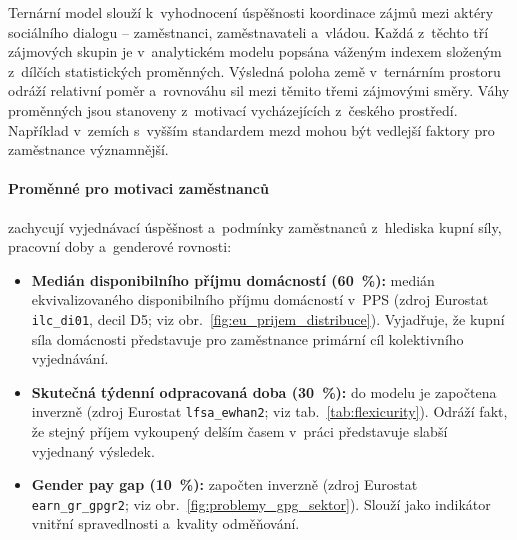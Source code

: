 Ternární model slouží k~vyhodnocení úspěšnosti koordinace zájmů mezi aktéry sociálního dialogu -- zaměstnanci, zaměstnavateli a~vládou. Každá z~těchto tří zájmových skupin je v~analytickém modelu popsána váženým indexem složeným z~dílčích statistických proměnných. Výsledná poloha země v~ternárním prostoru odráží relativní poměr a~rovnováhu sil mezi těmito třemi zájmovými směry. Váhy proměnných jsou stanoveny z~motivací vycházejících z~českého prostředí. Například v~zemích s~vyšším standardem mezd mohou být vedlejší faktory pro zaměstnance významnější.\par

\paragraph{Proměnné pro motivaci zaměstnanců}
zachycují vyjednávací úspěšnost a~podmínky zaměstnanců z~hlediska kupní síly, pracovní doby a~genderové rovnosti:
\begin{itemize}[noitemsep]
  \item \textbf{Medián disponibilního příjmu domácností (\SI{60}{\percent}):} medián ekvivalizovaného disponibilního příjmu domácností v~\acs{PPS} (zdroj Eurostat \texttt{ilc\_di01}, decil D5; viz obr.~\ref{fig:eu_prijem_distribuce}). Vyjadřuje, že kupní síla domácnosti představuje pro zaměstnance primární cíl kolektivního vyjednávání.
  \item \textbf{Skutečná týdenní odpracovaná doba (\SI{30}{\percent}):} do modelu je započtena inverzně (zdroj Eurostat \texttt{lfsa\_ewhan2}; viz tab.~\ref{tab:flexicurity}). Odráží fakt, že stejný příjem vykoupený delším časem v~práci představuje slabší vyjednaný výsledek.
  \item \textbf{Gender pay gap (\SI{10}{\percent}):} započten inverzně (zdroj Eurostat \texttt{earn\_gr\_gpgr2}; viz obr.~\ref{fig:problemy_gpg_sektor}). Slouží jako indikátor vnitřní spravedlnosti a~kvality odměňování.
\end{itemize}

